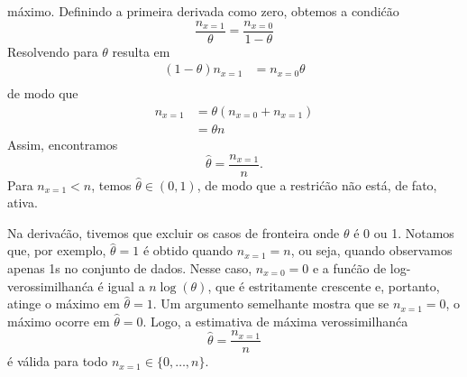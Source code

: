 \begin{exenumerate}
\begin{solution}
        m\'aximo. Definindo a primeira derivada como zero, obtemos a condi\'c\~ao
        \begin{equation}
            \frac{n_{x=1}}{\theta} = \frac{n_{x=0}}{1-\theta}
        \end{equation}
        Resolvendo para $\theta$ resulta em
        \begin{align}
            (1-\theta) n_{x=1} &= n_{x=0} \theta\\
        \end{align}
        de modo que
        \begin{align}
            n_{x=1} & = \theta( n_{x=0}+ n_{x=1})\\
            & = \theta n
        \end{align}
        Assim, encontramos
        \begin{equation}
            \hat{\theta} = \frac{n_{x=1}}{n}.
        \end{equation}
        Para $n_{x=1}< n$, temos $\hat{\theta} \in (0,1)$, de modo que a
        restri\'c\~ao n\~ao est\'a, de fato, ativa.
        
        Na deriva\'c\~ao, tivemos que excluir os casos de fronteira onde $\theta$
        \'e 0 ou 1. Notamos que, por exemplo, $\hat{\theta}=1$ \'e obtido quando
        $n_{x=1}=n$, ou seja, quando observamos apenas 1s no conjunto de dados. Nesse
        caso, $n_{x=0}=0$ e a fun\'c\~ao de log-verossimilhan\'ca \'e igual a
        $n\log(\theta)$, que \'e estritamente crescente e, portanto, atinge o
        m\'aximo em $\hat{\theta}=1$. Um argumento semelhante mostra que se
        $n_{x=1}=0$, o m\'aximo ocorre em $\hat{\theta}=0$. Logo, a estimativa de
        m\'axima verossimilhan\'ca
        \begin{equation}
            \hat{\theta} = \frac{n_{x=1}}{n}
        \end{equation}
        \'e v\'alida para todo $n_{x=1} \in \{0, \ldots, n\}$.
        

\end{solution}
\end{exenumerate}
